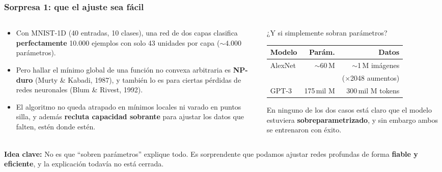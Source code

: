 \documentclass[aspectratio=169, 10pt]{beamer}
\newcommand{\idea}[1]{%
	\begin{tcolorbox}[colback=AccentGreen!6, colframe=AccentGreen, arc=3pt,
		width=\textwidth, boxsep=1pt, left=5pt, right=5pt, top=2pt, bottom=2pt,
		fontupper=\small]
		\RaggedRight\textbf{Idea clave:} #1
	\end{tcolorbox}
}
\begin{document}
\begin{frame}
\frametitle{Sorpresa 1: que el ajuste sea fácil}
\footnotesize %
\begin{columns}[T]
\begin{column}{6.3cm}
\begin{itemize}
	\item Con MNIST-1D (40 entradas, 10 clases), una red de dos capas clasifica \textbf{perfectamente} 10.000 ejemplos con solo 43 unidades por capa ($\sim$4.000 par\'ametros).
	\item Pero hallar el m\'inimo global de una funci\'on no convexa arbitraria es \textbf{NP-duro} (Murty \& Kabadi, 1987), y tambi\'en lo es para ciertas p\'erdidas de redes neuronales (Blum \& Rivest, 1992).
	\item El algoritmo no queda atrapado en m\'inimos locales ni varado en puntos silla, y adem\'as \textbf{recluta capacidad sobrante} para ajustar los datos que falten, est\'en donde est\'en.
\end{itemize}
\end{column}
\begin{column}{5.9cm}
\begin{alertblock}{¿Y si simplemente sobran parámetros?}
\footnotesize
\begin{tabular}{@{}lrr@{}}
\toprule
\textbf{Modelo} & \textbf{Par\'am.} & \textbf{Datos}\\
\midrule
AlexNet  & $\sim$60\,M  & $\sim$1\,M im\'agenes\\
         &              & ($\times$2048 aumentos)\\
GPT-3    & 175\,mil M   & 300\,mil M tokens\\
\bottomrule
\end{tabular}
\vspace{0.4em}

En ninguno de los dos casos est\'a claro que el modelo estuviera \textbf{sobreparametrizado}, y sin embargo ambos se entrenaron con \'exito.
\end{alertblock}
\end{column}
\end{columns}
\vspace{0.3em}
\idea{No es que ``sobren par\'ametros'' explique todo. Es sorprendente que podamos ajustar redes profundas de forma \textbf{fiable y eficiente}, y la explicaci\'on todav\'ia no est\'a cerrada.}
\end{frame}
\end{document}
